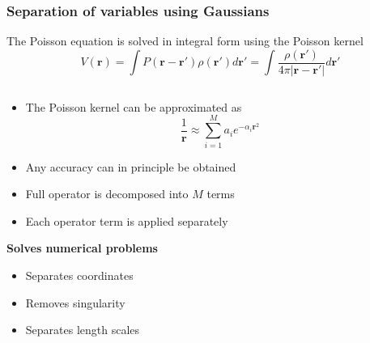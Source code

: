 \begin{frame}
    \frametitle{Separation of variables using Gaussians}
    \tiny
    \centering
    The Poisson equation is solved in integral form using the Poisson kernel
    \begin{equation}
	\nonumber
	V(\boldsymbol{r}) = \int P(\boldsymbol{r}-\boldsymbol{r'})
        \rho(\boldsymbol{r'}) d\boldsymbol{r'} =
	\int\frac{\rho(\boldsymbol{r'})}
        {4\pi|\boldsymbol{r} - \boldsymbol{r'}|} d\boldsymbol{r'} 
    \end{equation}

    \vspace{3mm}

    \begin{columns}
    \begin{column}{.50\textwidth}
    \begin{itemize}
	\item The Poisson kernel can be approximated as
	    \begin{equation}
		\nonumber
		\frac{1}{\boldsymbol{r}} \approx 
                \sum_{i=1}^M a_i e^{-\alpha_i \boldsymbol{r}^2} 
	    \end{equation}
	\item Any accuracy can in principle be obtained
	\item Full operator is decomposed into $M$ terms
	\item Each operator term is applied separately
    \end{itemize}

    \vspace{6mm}

    \hspace{3mm} \textbf{Solves numerical problems}

    \begin{itemize}
	\item	Separates coordinates
	\item	Removes singularity
	\item	Separates length scales
    \end{itemize}


\end{column}
\end{columns}
\end{frame}
